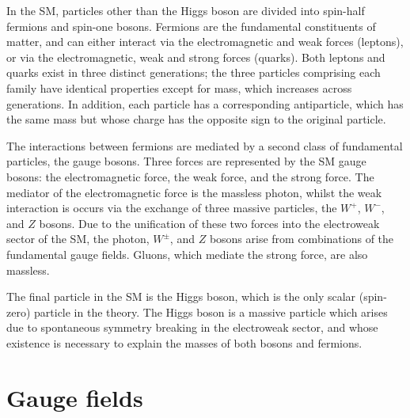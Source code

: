 In the SM, particles other than the Higgs boson are divided into spin-half fermions
and spin-one bosons.
Fermions are the fundamental constituents of matter, 
and can either interact via the electromagnetic and weak forces (leptons), 
or via the electromagnetic, weak and strong forces (quarks).
Both leptons and quarks exist in three distinct generations;
the three particles comprising each family have identical properties 
except for mass, which increases across generations.
In addition, each particle has a corresponding antiparticle, 
which has the same mass but whose charge has the opposite sign to the original particle.


The interactions between fermions are mediated by a second class of fundamental particles, 
the gauge bosons.
Three forces are represented by the SM gauge bosons: 
the electromagnetic force, the weak force, and the strong force.
The mediator of the electromagnetic force is the massless photon, 
whilst the weak interaction is occurs via the exchange of three massive particles, 
the $W^+$, $W^-$, and $Z$ bosons.
Due to the unification of these two forces into the electroweak sector of the SM, 
the photon, $W^\pm$, and $Z$ bosons arise from combinations of the fundamental gauge fields.
Gluons, which mediate the strong force, 
are also massless.


The final particle in the SM is the Higgs boson, 
which is the only scalar (spin-zero) particle in the theory.
The Higgs boson is a massive particle which arises 
due to spontaneous symmetry breaking in the electroweak sector, 
and whose existence is necessary to explain the masses of both bosons and fermions.

\section{Gauge fields}
\label{sec:theory_gauges}

